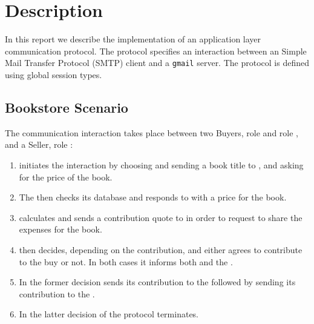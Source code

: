 \section{Description}

In this report we describe the implementation of
an application layer communication protocol.
The protocol specifies an interaction between
an Simple Mail Transfer Protocol (SMTP) client and a \lstinline|gmail| server.
The protocol is defined using global session types.

\subsection{Bookstore Scenario}
\label{subsec:description}

The communication interaction takes place between two Buyers,
role \BuyerOne and role \BuyerTwo, and a Seller,
role \Seller:
\begin{enumerate}
	\item
			\BuyerOne initiates the interaction
			by choosing and sending a book title to \Seller,
			and asking for the price of the book.

	\item
			The \Seller then checks its database and
			responds to \BuyerOne with a price for the book.

	\item
			\BuyerOne calculates and
			sends a contribution quote to
			\BuyerTwo in order to request to
			share the expenses for the book.

	\item
			\BuyerTwo then decides, depending on
			the contribution, and
			either agrees to contribute
			to the buy or not. In both
			cases it informs both \BuyerOne
			and the \Seller.

	\item
			In the former decision \BuyerOne
			sends its contribution to the \Seller
			followed by \BuyerTwo sending its
			contribution to the \Seller.

	\item
			In the latter decision of \BuyerTwo
			the protocol terminates.
\end{enumerate}
			

